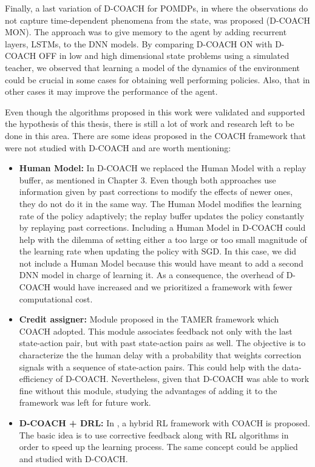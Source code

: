 Finally, a last variation of D-COACH for POMDPs, in where the observations do not capture time-dependent phenomena from the state, was proposed (D-COACH MON). The approach was to give memory to the agent by adding recurrent layers, LSTMs, to the DNN models. By comparing D-COACH ON with D-COACH OFF in low and high dimensional state problems using a simulated teacher, we observed that learning a model of the dynamics of the environment could be crucial in some cases for obtaining well performing policies. Also, that in other cases it may improve the performance of the agent. 

Even though the algorithms proposed in this work were validated and supported the hypothesis of this thesis, there is still a lot of work and research left to be done in this area. There are some ideas proposed in the COACH framework that were not studied with D-COACH and are worth mentioning:

\begin{itemize}
    \item \textbf{Human Model:} In D-COACH we replaced the Human Model with a replay buffer, as mentioned in Chapter 3. Even though both approaches use information given by past corrections to modify the effects of newer ones, they do not do it in the same way. The Human Model modifies the learning rate of the policy adaptively; the replay buffer updates the policy constantly by replaying past corrections. Including a Human Model in D-COACH could help with the dilemma of setting either a too large or too small magnitude of the learning rate when updating the policy with SGD. In this case, we did not include a Human Model because this would have meant to add a second DNN model in charge of learning it. As a consequence, the overhead of D-COACH would have increased and we prioritized a framework with fewer computational cost.
    \item \textbf{Credit assigner:} Module proposed in the TAMER framework \cite{Knox:2009:ISA:1597735.1597738} which COACH adopted. This module associates feedback not only with the last state-action pair, but with past state-action pairs as well. The objective is to characterize the the human delay with a probability that weights correction signals with a sequence of state-action pairs. This could help with the data-efficiency of D-COACH. Nevertheless, given that D-COACH was able to work fine without this module, studying the advantages of adding it to the framework was left for future work. 
    \item \textbf{D-COACH + DRL:} In \cite{celemin2018fast}, a hybrid RL framework with COACH is proposed. The basic idea is to use corrective feedback along with RL algorithms in order to speed up the learning process. The same concept could be applied and studied with D-COACH. 
\end{itemize}

